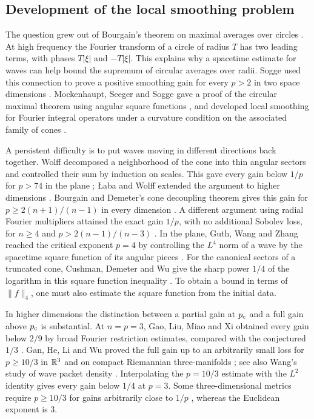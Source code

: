 \subsection{Development of the local smoothing problem}\label{subsec:history}

The question grew out of Bourgain's theorem on maximal averages over
circles \cite{Bourgain1986Circles}. At high frequency the Fourier
transform of a circle of radius \(T\) has two leading terms, with phases
\(T|\xi|\) and \(-T|\xi|\). This explains why a spacetime estimate for
waves can help bound the supremum of circular averages over radii.
Sogge used this connection to prove a positive smoothing gain for every
\(p>2\) in two space dimensions \cite[Theorem~4.1]{Sogge1991}. Mockenhaupt, Seeger
and Sogge gave a proof of the circular maximal theorem using angular
square functions \cite{MSS1992}, and developed local smoothing for
Fourier integral operators under a curvature condition on the
associated family of cones \cite{MSS1993}.

A persistent difficulty is to put waves moving in different directions
back together. Wolff decomposed a neighborhood of the cone into thin
angular sectors and controlled their sum by induction on scales. This
gave every gain below \(1/p\) for \(p>74\) in the plane
\cite{Wolff2000}; {\L}aba and Wolff extended the argument to higher
dimensions \cite{LabaWolff2002}. Bourgain and Demeter's cone decoupling
theorem gives this gain for \(p\ge 2(n+1)/(n-1)\) in every dimension
\cite[Theorem~1.2]{BourgainDemeter2015}. A different argument using
radial Fourier multipliers attained the exact gain \(1/p\), with no
additional Sobolev loss, for \(n\ge4\) and \(p>2(n-1)/(n-3)\)
\cite[Theorem~1.2]{HeoNazarovSeeger2011}. In the plane, Guth, Wang
and Zhang reached the critical exponent \(p=4\) by controlling the
\(L^4\) norm of a wave by the spacetime square function of its angular
pieces \cite[Theorems~1.1 and~1.2]{GWZ2020}. For the canonical
sectors of a truncated cone, Cushman, Demeter and Wu give the sharp
power \(1/4\) of the logarithm in this square function inequality
\cite[Theorem~1.4]{CushmanDemeterWu2026}. To obtain a bound in
terms of \(\|f\|_4\), one must also estimate the square function from
the initial data.

In higher dimensions the distinction between a partial gain at \(p_{\mathrm c}\)
and a full gain above \(p_{\mathrm c}\) is substantial. At \(n=p=3\), Gao, Liu,
Miao and Xi obtained every gain below \(2/9\) by broad Fourier
restriction estimates, compared with the conjectured \(1/3\)
\cite[Corollary~1.3]{GaoLiuMiaoXi2023}. Gan, He, Li and Wu proved the
full gain up to an arbitrarily small loss for \(p\ge10/3\) in
\(\mathbb R^3\) and on compact Riemannian three-manifolds
\cite[Theorem~1.3]{GHLW2026}; see also Wang's study of wave packet
density \cite{Wang2026v4}. Interpolating the \(p=10/3\) estimate with
the \(L^2\) identity gives every gain below \(1/4\) at \(p=3\).
Some three-dimensional metrics require
\(p\ge10/3\) for gains arbitrarily close to \(1/p\)
\cite{MinicozziSogge1997}, whereas the Euclidean exponent is \(3\).
